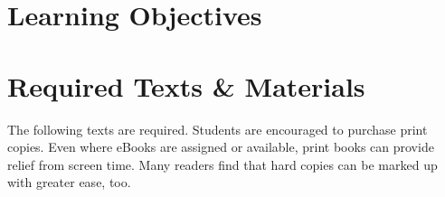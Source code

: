 \documentclass[titlepage]{article}
\newcommand\incl{../includes}
\begin{document}


\section{Learning Objectives}
\label{objectives}
\edobject

\section{Required Texts \& Materials}
\label{texts}

The following texts are required. Students are encouraged to
purchase print copies. Even where eBooks are assigned or available, print books can provide relief from screen time. Many readers find that hard copies can be marked up with greater ease, too.
\end{document}
